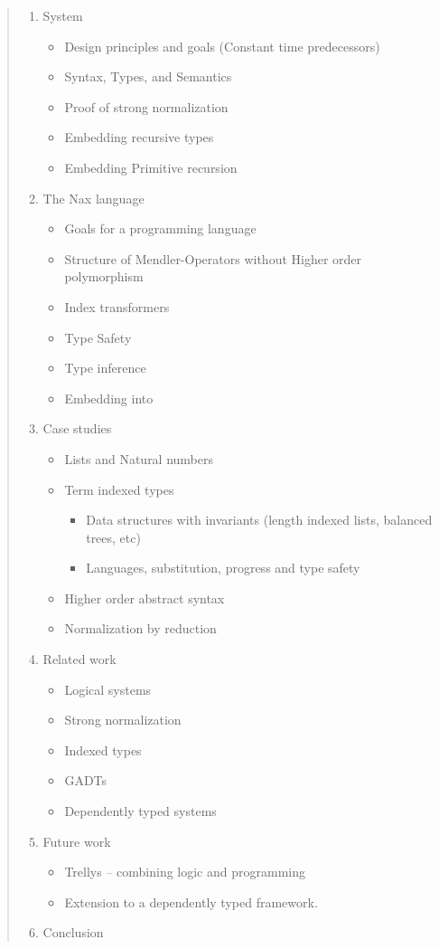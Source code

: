 \begin{quote}
\begin{enumerate}[1.]
\item System \Fixi
  \begin{itemize}
     \item Design principles and goals (Constant time predecessors)
     \item Syntax, Types, and Semantics
     \item Proof of strong normalization
     \item Embedding recursive types
     \item Embedding Primitive recursion
  \end{itemize}
  
\item The Nax language
  \begin{itemize}
    \item Goals for a programming language
    \item Structure of Mendler-Operators without Higher order polymorphism
    \item Index transformers
    \item Type Safety
    \item Type inference
    \item Embedding into \Fixw
  \end{itemize}
  
\item Case studies
  \begin{itemize}
    \item Lists and Natural numbers
    \item Term indexed types
    	\begin{itemize}
    	  \item Data structures with invariants (length indexed lists, balanced trees, etc)
    	  \item Languages, substitution, progress and type safety
    	\end{itemize}
    \item Higher order abstract syntax
    \item Normalization by reduction
  \end{itemize}

\item Related work
  \begin{itemize}
    \item Logical systems
    \item Strong normalization
    \item Indexed types
    \item GADTs
    \item Dependently typed systems
  \end{itemize}
  
\item Future work
  \begin{itemize}
    \item Trellys -- combining logic and programming
    \item Extension to a dependently typed framework.
 \end{itemize}
 
\item Conclusion
\end{enumerate}
\end{quote}

